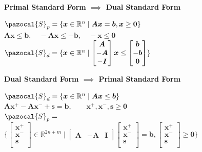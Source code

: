 \documentclass[english]{latex4ei/latex4ei_sheet}
\begin{document}
\begin{sectionbox}
	\textbf{Primal Standard Form $\implies$ Dual Standard Form}
	\begin{center}
		$\pazocal{S}_p = \{ \bm{x} \in \mathbb{R}^n \mid \bm{A}\bm{x} = \bm{b}, \bm{x} \geq \bm{0} \}$ \\
		\vspace{0.5em}
		$\bm{A}\bm{x} \leq \bm{b}, \quad -\bm{A}\bm{x} \leq -\bm{b}, \quad -\bm{x} \leq \bm{0}$ \\
		\vspace{0.5em}
		$\pazocal{S}_d = \{ \bm{x} \in \mathbb{R}^n \mid \begin{bmatrix}
			\bm{A} \\
			-\bm{A} \\
			-\bm{I} \\
		\end{bmatrix} \bm{x} \leq \begin{bmatrix}
		\bm{b} \\
		-\bm{b} \\
		\bm{0} \\
	\end{bmatrix} \}$
	\end{center}
	\vspace{1em}
	\textbf{Dual Standard Form $\implies$ Primal Standard Form}
	\begin{center}
		$\pazocal{S}_d = \{ \bm{x} \in \mathbb{R}^n \mid \bm{A}\bm{x} \leq \bm{b}\}$ \\
		\vspace{0.5em}
		$\bm{A}\bm{x}^+ - \bm{A}\bm{x}^- + \bm{s} = \bm{b}, \qquad \bm{x}^+, \bm{x}^-, \bm{s} \geq \bm{0}$ \\
		\vspace{0.5em}
		$\pazocal{S}_p =$ \\
		$\big\{ \begin{bmatrix}
			\bm{x}^+ \\
			\bm{x}^- \\
			\bm{s} \\
		\end{bmatrix} \in \mathbb{R}^{2n+m} \mid \begin{bmatrix}
			\bm{A} & -\bm{A} & \bm{I}
			\end{bmatrix} \begin{bmatrix}
			\bm{x}^+ \\
			\bm{x}^- \\
			\bm{s} \\
		\end{bmatrix} = \bm{b}, \begin{bmatrix}
		\bm{x}^+ \\
		\bm{x}^- \\
		\bm{s} \\
	\end{bmatrix} \geq \bm{0} \big\}$
	\end{center}
\end{sectionbox}
\end{document}
